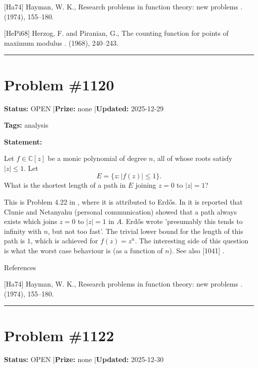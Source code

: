 \documentclass{article}
\begin{document}
[Ha74] Hayman, W. K., Research problems in function theory: new problems . (1974), 155--180.

[HePi68] Herzog, F. and Piranian, G., The counting function for points of maximum modulus . (1968), 240--243.

\noindent\rule{\linewidth}{0.4pt}


\section{Problem \#1120}
\label{prob:1120}

\noindent\textbf{Status:} OPEN \quad|\quad \textbf{Prize:} none \quad|\quad \textbf{Updated:} 2025-12-29

\noindent\textbf{Tags:} analysis

\medskip

\noindent\textbf{Statement:}

Let $f\in \mathbb{C}[z]$ be a monic polynomial of degree $n$, all of whose roots satisfy $\lvert z\rvert\leq 1$. Let\[E= \{ z : \lvert f(z)\rvert \leq 1\}.\]What is the shortest length of a path in $E$ joining $z=0$ to $\lvert z\rvert =1$?




This is Problem 4.22 in \cite{Ha74}, where it is attributed to Erd\H{o}s. In \cite{Ha74} it is reported that Clunie and Netanyahu (personal communication) showed that a path always exists which joins $z=0$ to $\lvert z\rvert=1$ in $A$. Erd\H{o}s wrote 'presumably this tends to infinity with $n$, but not too fast'. The trivial lower bound for the length of this path is $1$, which is achieved for $f(z)=z^n$. The interesting side of this question is what the worst case behaviour is (as a function of $n$). See also [1041] .




References

[Ha74] Hayman, W. K., Research problems in function theory: new problems . (1974), 155--180.

\noindent\rule{\linewidth}{0.4pt}


\section{Problem \#1122}
\label{prob:1122}

\noindent\textbf{Status:} OPEN \quad|\quad \textbf{Prize:} none \quad|\quad \textbf{Updated:} 2025-12-30
\end{document}
